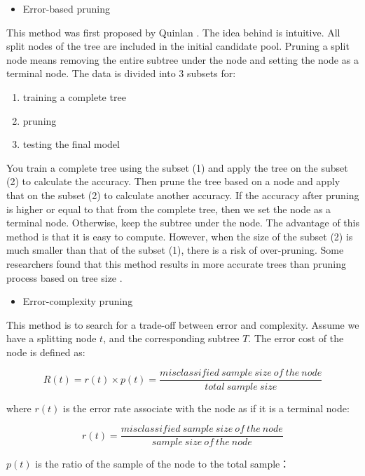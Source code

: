 \documentclass[
  12pt,
]{krantz}
\providecommand{\tightlist}{%
  \setlength{\itemsep}{0pt}\setlength{\parskip}{0pt}}
\begin{document}
\begin{itemize}
\tightlist
\item
  Error-based pruning
\end{itemize}

This method was first proposed by Quinlan \citep{Quinlan1999}. The idea behind is intuitive. All split nodes of the tree are included in the initial candidate pool. Pruning a split node means removing the entire subtree under the node and setting the node as a terminal node. The data is divided into 3 subsets for:

\begin{enumerate}
\def\labelenumi{(\arabic{enumi})}
\item
  training a complete tree
\item
  pruning
\item
  testing the final model
\end{enumerate}

You train a complete tree using the subset (1) and apply the tree on the subset (2) to calculate the accuracy. Then prune the tree based on a node and apply that on the subset (2) to calculate another accuracy. If the accuracy after pruning is higher or equal to that from the complete tree, then we set the node as a terminal node. Otherwise, keep the subtree under the node. The advantage of this method is that it is easy to compute. However, when the size of the subset (2) is much smaller than that of the subset (1), there is a risk of over-pruning. Some researchers found that this method results in more accurate trees than pruning process based on tree size \citep{Espoito1997}.

\begin{itemize}
\tightlist
\item
  Error-complexity pruning
\end{itemize}

This method is to search for a trade-off between error and complexity. Assume we have a splitting node \(t\), and the corresponding subtree \(T\). The error cost of the node is defined as:

\[R(t)=r(t)\times p(t) = \frac{misclassified\ sample\ size\ of\ the\ node}{total\ sample\ size}\]

where \(r(t)\) is the error rate associate with the node as if it is a terminal node:

\[r(t)=\frac{misclassified\ sample\ size\ of\ the\ node}{sample\ size\ of\ the\ node}\]

\(p(t)\) is the ratio of the sample of the node to the total sample：
\end{document}
